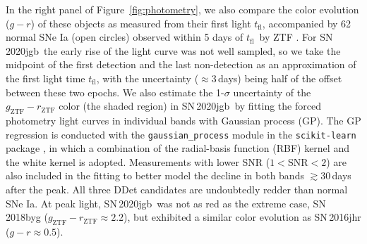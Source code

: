\documentclass[twocolumn]{aastex631}
\newcommand{\sn}{SN\,2020jgb}
\newcommand{\tfl}{$t_\mathrm{fl}$}
\newcommand{\chang}[1]{\textcolor{blue}{[Chang: #1]}}
\begin{document}
In the right panel of Figure~\ref{fig:photometry}, we also compare the color evolution ($g-r$) of these objects as measured from their first light \tfl, accompanied by 62 normal SNe Ia (open circles) observed within 5 days of \tfl\ by ZTF \citep[from][]{Bulla2020}. For \sn\, the early rise of the light curve was not well sampled, so we take the midpoint of the first detection and the last non-detection as an approximation of the first light time \tfl, with the uncertainty ($\approx$3\,days) being half of the offset between these two epochs. We also estimate the 1-$\sigma$ uncertainty of the $g_\mathrm{ZTF}-r_\mathrm{ZTF}$ color (the shaded region) in \sn\ by fitting the forced photometry light curves in individual bands with Gaussian process (GP). The GP regression is conducted with the \texttt{gaussian\_process} module in the \texttt{scikit-learn} package \citep{scikit-learn}, in which a combination of the radial-basis function (RBF) kernel and the white kernel is adopted. Measurements with lower SNR ($1<\mathrm{SNR}<2$) are also included in the fitting to better model the decline in both bands $\gtrsim$30\,days after the peak. %
All three DDet candidates are undoubtedly redder than normal SNe Ia. At peak light, \sn\ was not as red as the extreme case, SN\,2018byg ($g_\mathrm{ZTF}-r_\mathrm{ZTF}\approx2.2$), but exhibited a similar color evolution as SN\,2016jhr ($g-r\approx0.5$). %
\end{document}
